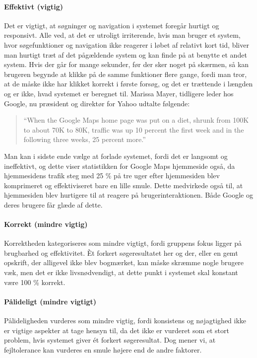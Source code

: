 \paragraph{Effektivt (vigtig)} 
Det er vigtigt, at søgninger og navigation i systemet foregår hurtigt og responsivt. Alle ved, at det er utroligt irriterende, hvis man bruger et system, hvor søgefunktioner og navigation ikke reagerer i løbet af relativt kort tid, bliver man hurtigt træt af det pågældende system og kan finde på at benytte et andet system. Hvis der går for mange sekunder, før der sker noget på skærmen, så kan brugeren begynde at klikke på de samme funktioner flere gange, fordi man tror, at de måske ikke har klikket korrekt i første forsøg, og det er trættende i længden og er ikke, hvad systemet er beregnet til. Marissa Mayer, tidligere leder hos Google, nu præsident og direktør for Yahoo udtalte følgende: \cite{googlespeed}

\begin{quote}
``When the Google Maps home page was put on a diet, shrunk from 100K to about 70K to 80K, traffic was up 10 percent the first week and in the following three weeks, 25 percent more.''
\end{quote}  

Man kan i sidste ende vælge at forlade systemet, fordi det er langsomt og ineffektivt, og dette viser statistikken for Google Maps hjemmeside også, da hjemmesidens trafik steg med 25 \% på tre uger efter hjemmesiden blev komprimeret og effektiviseret bare en lille smule. Dette medvirkede også til, at hjemmesiden blev hurtigere til at reagere på brugerinteraktionen. Både Google og deres brugere får glæde af dette.

\paragraph{Korrekt (mindre vigtig)} 
Korrektheden kategoriseres som mindre vigtigt, fordi gruppens fokus ligger på brugbarhed og effektivitet. Èt forkert søgeresultatet her og der, eller en gemt opskrift, der alligevel ikke blev bogmærket, kan måske skræmme nogle brugere væk, men det er ikke livsnødvendigt, at dette punkt i systemet skal konstant være 100 \% korrekt.

\paragraph{Pålideligt (mindre vigtigt)} 
Pålideligheden vurderes som mindre vigtig, fordi konsistens og nøjagtighed ikke er vigtige aspekter at tage hensyn til, da det ikke er vurderet som et stort problem, hvis systemet giver ét forkert søgeresultat. Dog mener vi, at fejltolerance kan vurderes en smule højere end de andre faktorer. 

